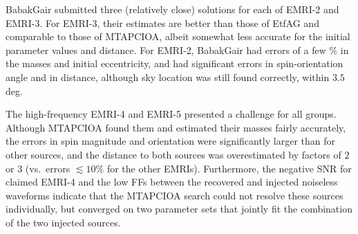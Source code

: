 \documentclass{iopart}
\begin{document}
BabakGair submitted three (relatively close) solutions for each of EMRI-2 and EMRI-3.  For EMRI-3, their estimates are better than those of EtfAG and comparable to those of MTAPCIOA, albeit somewhat less accurate for the initial parameter values and distance.  For EMRI-2, BabakGair had errors of a few \% in the masses and initial eccentricity, and had significant errors in spin-orientation angle and in distance, although sky location was still found correctly, within $3.5$ deg.

The high-frequency EMRI-4 and EMRI-5 presented a challenge for all groups.  Although MTAPCIOA found them and estimated their masses fairly accurately, the errors in spin magnitude and orientation were significantly larger than for other sources, and the distance to both sources was overestimated by factors of $2$ or $3$ (vs.\ errors $\lesssim 10\%$ for the other EMRIs).  Furthermore, the negative SNR for claimed EMRI-4 and the low FFs between the recovered and injected noiseless waveforms
indicate that the MTAPCIOA search could not resolve these sources individually, but converged on two parameter sets that jointly fit the combination of the two injected sources.   
\end{document}
